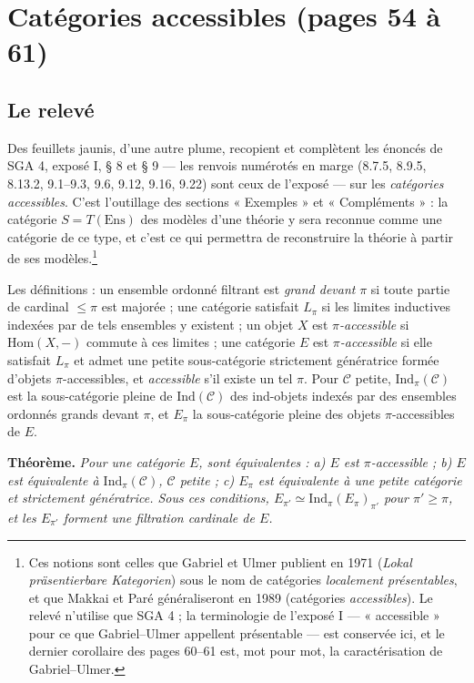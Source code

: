 \documentclass[11pt,a4paper]{article}
\begin{document}
\section*{Catégories accessibles (pages 54 à 61)}

\subsection*{Le relevé}

Des feuillets jaunis, d'une autre plume, recopient et complètent les
énoncés de SGA 4, exposé I, § 8 et § 9 — les renvois numérotés en marge
(8.7.5, 8.9.5, 8.13.2, 9.1--9.3, 9.6, 9.12, 9.16, 9.22) sont ceux de
l'exposé — sur les \emph{catégories accessibles}. C'est l'outillage des
sections « Exemples » et « Compléments » : la catégorie $S = T(\mathrm{Ens})$
des modèles d'une théorie y sera reconnue comme une catégorie de ce type,
et c'est ce qui permettra de reconstruire la théorie à partir de ses
modèles.\footnote{Ces notions sont celles que Gabriel et Ulmer publient en
1971 (\emph{Lokal präsentierbare Kategorien}) sous le nom de catégories
\emph{localement présentables}, et que Makkai et Paré généraliseront en
1989 (catégories \emph{accessibles}). Le relevé n'utilise que SGA 4 ; la
terminologie de l'exposé I — « accessible » pour ce que Gabriel--Ulmer
appellent présentable — est conservée ici, et le dernier corollaire des
pages 60--61 est, mot pour mot, la caractérisation de Gabriel--Ulmer.}

Les définitions : un ensemble ordonné filtrant est \emph{grand devant}
$\pi$ si toute partie de cardinal $\leqslant \pi$ est majorée ; une
catégorie satisfait $L_{\pi}$ si les limites inductives indexées par de tels
ensembles y existent ; un objet $X$ est \emph{$\pi$-accessible} si
$\mathrm{Hom}(X, -)$ commute à ces limites ; une catégorie $E$ est
\emph{$\pi$-accessible} si elle satisfait $L_{\pi}$ et admet une petite
sous-catégorie strictement génératrice formée d'objets $\pi$-accessibles,
et \emph{accessible} s'il existe un tel $\pi$. Pour $\mathcal{C}$ petite,
$\mathrm{Ind}_{\pi}(\mathcal{C})$ est la sous-catégorie pleine de
$\mathrm{Ind}(\mathcal{C})$ des ind-objets indexés par des ensembles
ordonnés grands devant $\pi$, et $E_{\pi}$ la sous-catégorie pleine des
objets $\pi$-accessibles de $E$.

\textbf{Théorème.} \emph{Pour une catégorie $E$, sont équivalentes : a) $E$
est $\pi$-accessible ; b) $E$ est équivalente à $\mathrm{Ind}_{\pi}
(\mathcal{C})$, $\mathcal{C}$ petite ; c) $E_{\pi}$ est équivalente à une
petite catégorie et strictement génératrice. Sous ces conditions,
$E_{\pi'} \simeq \mathrm{Ind}_{\pi}(E_{\pi})_{\pi'}$ pour $\pi' \geqslant \pi$,
et les $E_{\pi'}$ forment une filtration cardinale de $E$.}
\end{document}
